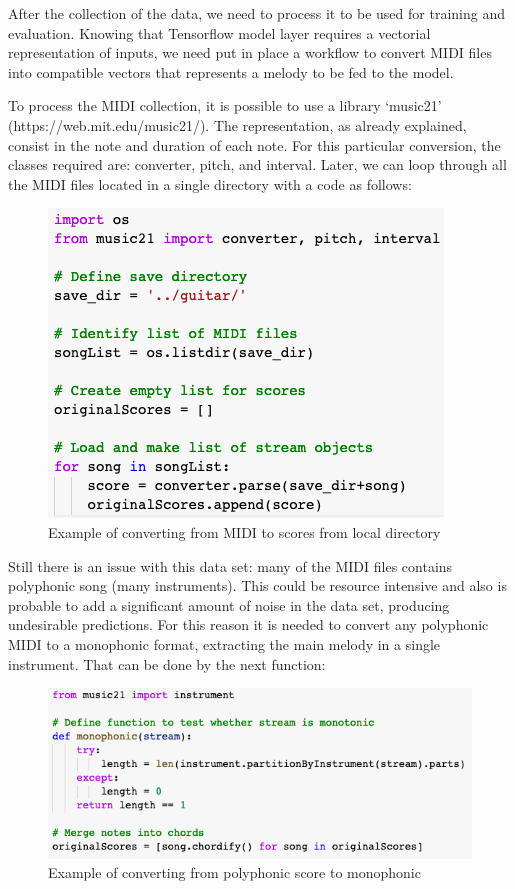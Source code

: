 After the collection of the data, we need to process it to be used for training and
evaluation. Knowing that Tensorflow model layer requires a vectorial representation of
inputs, we need put in place a workflow to convert MIDI files into compatible vectors that
represents a melody to be fed to the model.

To process the MIDI collection, it is possible to use a library ‘music21’
(https://web.mit.edu/music21/). The representation, as already explained, consist in the
note and duration of each note. For this particular conversion, the classes required are:
converter, pitch, and interval. Later, we can loop through all the MIDI files located in a
single directory with a code as follows:

\begin{figure}[h!]
  \includegraphics[width=\linewidth]{image/fig_JDF17.png}
  \caption{Example of converting from MIDI to scores from local directory }
\end{figure}


Still there is an issue with this data set: many of the MIDI files contains polyphonic
song (many instruments). This could be resource intensive and also is probable to add a
significant amount of noise in the data set, producing undesirable predictions. For this
reason it is needed to convert any polyphonic MIDI to a monophonic format, extracting the
main melody in a single instrument. That can be done by the next function:

\begin{figure}[h!]
  \includegraphics[width=\linewidth]{image/fig_JDF18.png}
  \caption{Example of converting from polyphonic score to monophonic }
\end{figure}


